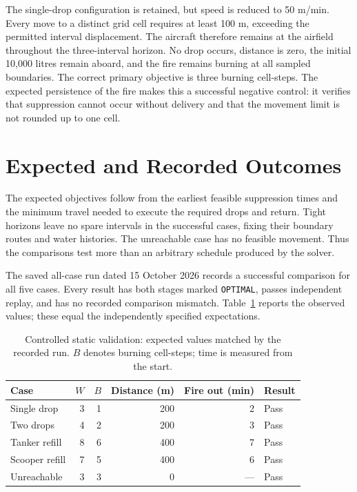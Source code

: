 The single-drop configuration is retained, but speed is reduced to 50 m/min. Every move to a distinct grid cell requires at least 100 m, exceeding the permitted interval displacement. The aircraft therefore remains at the airfield throughout the three-interval horizon. No drop occurs, distance is zero, the initial 10,000 litres remain aboard, and the fire remains burning at all sampled boundaries. The correct primary objective is three burning cell-steps. The expected persistence of the fire makes this a successful negative control: it verifies that suppression cannot occur without delivery and that the movement limit is not rounded up to one cell.

\section{Expected and Recorded Outcomes}
\label{sec:validation-outcomes}

The expected objectives follow from the earliest feasible suppression times and the minimum travel needed to execute the required drops and return. Tight horizons leave no spare intervals in the successful cases, fixing their boundary routes and water histories. The unreachable case has no feasible movement. Thus the comparisons test more than an arbitrary schedule produced by the solver.

The saved all-case run dated 15 October 2026 records a successful comparison for all five cases. Every result has both stages marked \texttt{OPTIMAL}, passes independent replay, and has no recorded comparison mismatch. Table~\ref{tab:controlled-results} reports the observed values; these equal the independently specified expectations.

\begin{table}[htbp]
\centering
\small
\caption{Controlled static validation: expected values matched by the recorded run. $B$ denotes burning cell-steps; time is measured from the start.}
\label{tab:controlled-results}
\begin{tabular}{lrrrrl}
\hline
Case & $W$ & $B$ & Distance (m) & Fire out (min) & Result \\
\hline
Single drop & 3 & 1 & 200 & 2 & Pass \\
Two drops & 4 & 2 & 200 & 3 & Pass \\
Tanker refill & 8 & 6 & 400 & 7 & Pass \\
Scooper refill & 7 & 5 & 400 & 6 & Pass \\
Unreachable & 3 & 3 & 0 & --- & Pass \\
\hline
\end{tabular}
\end{table}

